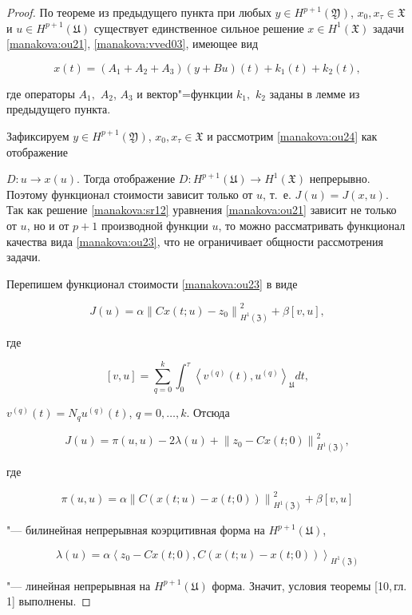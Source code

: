 \begin{proof}

По теореме из предыдущего пункта при любых $y\in H^{p+1}(\mathfrak{Y})$, $x_0, x_{\tau}\in{\mathfrak{X}}$ и $u\in H^{p+1}(\mathfrak{U})$ существует единственное сильное решение $x\in H^1(\mathfrak{X})$ задачи \eqref{manakova:ou21}, \eqref{manakova:vved03}, имеющее вид

\begin{equation}\label{manakova:ou24}

x(t)=(A_1+A_2 +A_3)(y + Bu)(t) + k_1(t) + k_2(t),

\end{equation}

где операторы $A_1,$ $ A_2$, $A_3$ и вектор"=функции $k_1,$ $ k_2$ заданы в лемме из предыдущего пункта.



Зафиксируем $y\in H^{p+1}(\mathfrak Y)$, $x_0, x_{\tau}\in{\mathfrak{X}}$ и рассмотрим \eqref{manakova:ou24} как отображение

$D:u\rightarrow x(u)$. Тогда отображение $D:{H}^{p+1}({\mathfrak{U}})\rightarrow H^1(\mathfrak X)$ непрерывно. Поэтому функционал стоимости зависит только от $u$, т.~е. $J(u)=J(x,u)$. Так как решение  \eqref{manakova:sr12} уравнения \eqref{manakova:ou21} зависит не только от $u$, но и от $p+1$ производной функции $u$, то можно рассматривать функционал качества вида \eqref{manakova:ou23}, что не ограничивает общности рассмотрения задачи.



Перепишем функционал стоимости \eqref{manakova:ou23} в виде

$$

J(u)=\alpha\left\|Cx(t;u)-z_0\right\|^2_{H^1({\mathfrak{Z}})}+\beta[v,u],

$$

где

$$

[v,u]= \sum^{k}_{q=0}

\int^{\tau}_{0}\left\langle v^{(q)}(t),u^{(q)}\right\rangle_\mathfrak U dt,

$$

$v^{(q)}(t)=N_qu^{(q)}(t)$, $q=0,\ldots,k$. Отсюда

$$

J(u)=\pi(u,u)-2\lambda(u)+\left\|z_0-Cx(t;0)\right\|^2_{H^1({\mathfrak{Z}})},

$$

где

$$

\pi(u,u)=\alpha\left\|C(x(t;u)-x(t;0))\right\|^2_{H^1(\mathfrak {Z})} + \beta[v,u]

$$

"--- билинейная непрерывная коэрцитивная форма на ${H}^{p+1}({\mathfrak{U}})$, 

$$

\lambda(u)=\alpha\left\langle z_0-Cx(t;0),C(x(t;u)-x(t;0))\right\rangle_{H^1({\mathfrak{Z}})}

$$

"--- линейная непрерывная на ${H}^{p+1}({\mathfrak{U}})$ форма. Значит, условия теоремы [10,\,гл.\,1] выполнены.

\end{proof}



